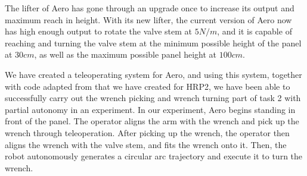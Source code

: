 \documentclass{standalone}
\begin{document}
The lifter of Aero has gone through an upgrade once to increase its output and maximum reach in height. With its new lifter, the current version of Aero now has high enough output to rotate the valve stem at $5N/m$, and it is capable of reaching and turning the valve stem at the minimum possible height of the panel at $30cm$, as well as the maximum possible panel height at $100cm$.

We have created a teleoperating system for Aero, and using this system, together with code adapted from that we have created for HRP2, we have been able to successfully carry out the wrench picking and wrench turning part of task 2 with partial autonomy in an experiment. In our experiment, Aero begins standing in front of the panel. The operator aligns the arm with the wrench and pick up the wrench through teleoperation. After picking up the wrench, the operator then aligns the wrench with the valve stem, and fits the wrench onto it. Then, the robot autonomously generates a circular arc trajectory and execute it to turn the wrench.
\end{document}
